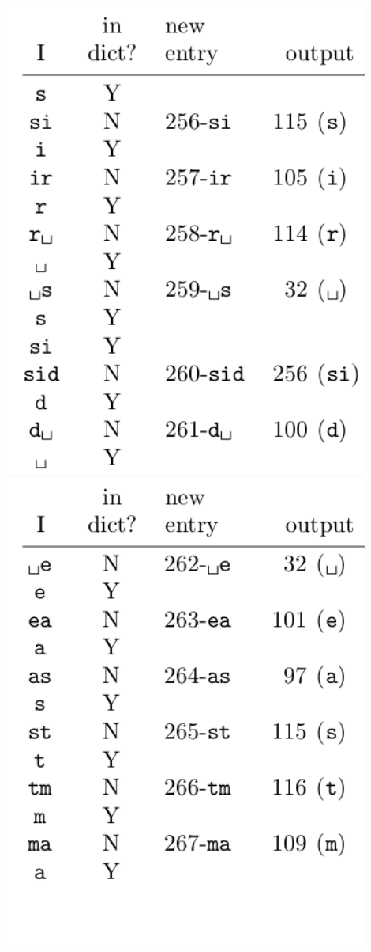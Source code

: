 \begin{frame}[allowframebreaks]
   \begin{columns}[T]
   \includegraphics[width=0.9\textwidth]{images/lzw_encoding01.png}
   \includegraphics[width=0.9\textwidth]{images/lzw_encoding02.png}

\end{columns}
\end{frame}

